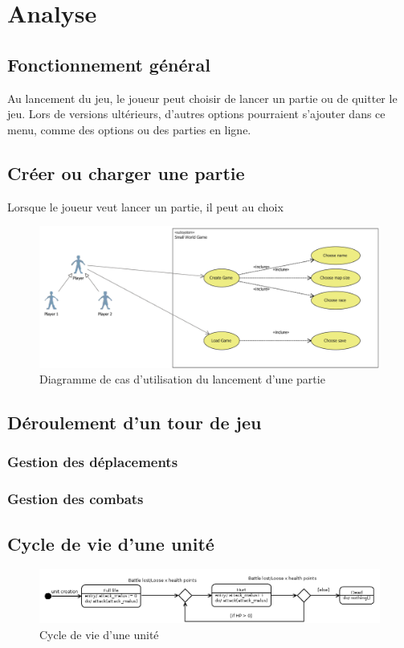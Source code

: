 \section{Analyse}

\subsection{Fonctionnement général}

Au lancement du jeu, le joueur peut choisir de lancer un partie ou de quitter le jeu. Lors de versions ultérieurs, d'autres options pourraient s'ajouter dans ce menu, comme des options ou des parties en ligne.

\subsection{Créer ou charger une partie}

Lorsque le joueur veut lancer un partie, il peut au choix

\begin{figure}[h]
  \centering
  \includegraphics[width=13cm]{schemas/uc_game_creation.png}
  \caption{Diagramme de cas d'utilisation du lancement d'une partie}
  \label{uc_game_creation}
\end{figure}


\subsection{Déroulement d'un tour de jeu}
\subsubsection{Gestion des déplacements}
\subsubsection{Gestion des combats}

\subsection{Cycle de vie d'une unité}

\begin{figure}[!h]
  \centering
  \includegraphics[width=13cm]{schemas/state-diagram.png}
  \caption{Cycle de vie d'une unité}
  \label{state-diagram}
\end{figure}


